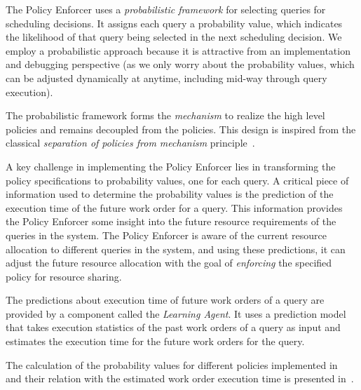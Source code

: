 The Policy Enforcer uses a \textit{probabilistic framework} for selecting queries for scheduling decisions. It assigns each query a probability value, which indicates the likelihood of that query being selected in the next scheduling decision. %
We employ a probabilistic approach because it is attractive from an implementation and debugging perspective (as we only worry about the probability values, which can be adjusted dynamically at anytime, including mid-way through query execution).

The probabilistic framework forms the \textit{mechanism} to realize the high level policies and remains decoupled from the policies.
This design is inspired from the classical \textit{separation of policies from mechanism} principle~\cite{LampsonS76}.

A key challenge in implementing the Policy Enforcer lies in transforming the policy specifications to probability values, one for each query.
A critical piece of information used to determine the probability values is the prediction of the execution time of the future work order for a query.
This information provides the Policy Enforcer some insight into the future resource requirements of the queries in the system.
The Policy Enforcer is aware of the current resource allocation to different queries in the system, and using these predictions, it can adjust the future resource allocation with the goal of \textit{enforcing} the specified policy for resource sharing.

The predictions about execution time of future work orders of a query are provided by a component called the \textit{Learning Agent}.
It uses a prediction model that takes execution statistics of the past work orders of a query as input and estimates the execution time for the future work orders for the query.

The calculation of the probability values for different policies implemented in \Quickstep\, and their relation with the estimated work order execution time is presented in~\cite{scheduler}.

